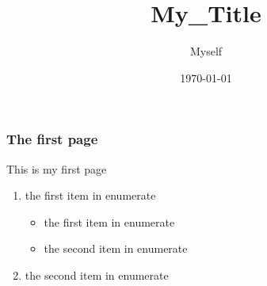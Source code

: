 \documentclass{beamer}
\title{My\_Title}
\author{Myself}
\date{\today}
\begin{document}
\begin{frame}
	\frametitle{The first page}
This is my first page

	\begin{enumerate}
		\item the first item in enumerate
		\begin{itemize}
			\item the first item in enumerate
			\item the second item in enumerate
		\end{itemize}
		\item the second item in enumerate
	\end{enumerate}
\end{frame}
\end{document}
